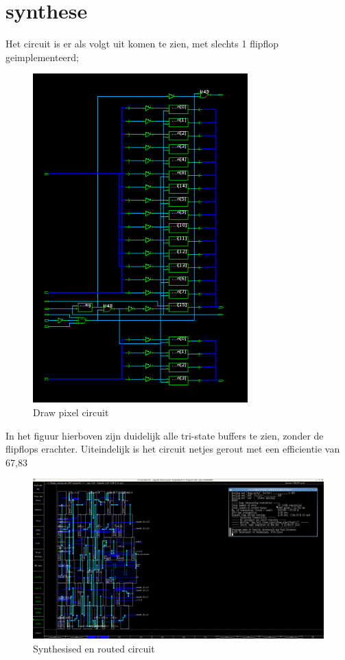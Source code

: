 \documentclass{scrreprt} %
\begin{document}
\section{synthese}
Het circuit is er als volgt uit komen te zien, met slechts 1 flipflop geimplementeerd;
\begin{figure} [h!]
\includegraphics [scale= 0.3] {inputfiles/dp_circ}
\caption{Draw pixel circuit}
\label{Th1}
\end{figure}
In het figuur hierboven zijn duidelijk alle tri-state buffers te zien, zonder de flipflops erachter. Uiteindelijk is het circuit netjes gerout met een efficientie van 67,83%
\begin{figure} [h!]
\includegraphics [scale= 0.3] {inputfiles/dp_trout}
\caption{Synthesised en routed circuit}
\label{Th1}
\end{figure}
\end{document}
